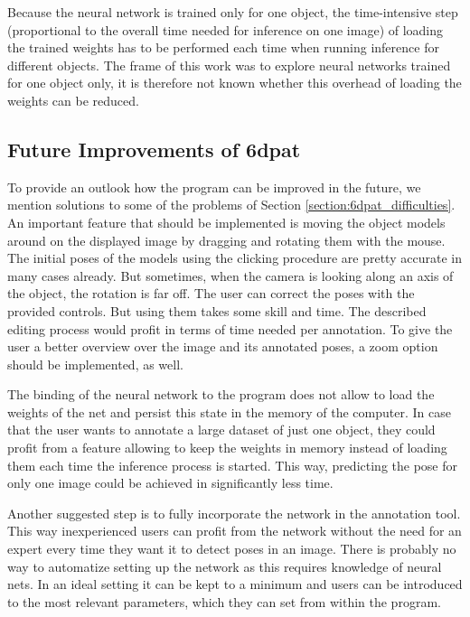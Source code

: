 Because the neural network is trained only for one object, the time-intensive step (proportional to the overall time needed for inference on one image) of loading the trained weights has to be performed each time when running inference for different objects. The frame of this work was to explore neural networks trained for one object only, it is therefore not known whether this overhead of loading the weights can be reduced.

\subsection{Future Improvements of \gls{6dpat}}

To provide an outlook how the program can be improved in the future, we mention solutions to some of the problems of Section \ref{section:6dpat_difficulties}. An important feature that should be implemented is moving the object models around on the displayed image by dragging and rotating them with the mouse. The initial poses of the models using the clicking procedure are pretty accurate in many cases already. But sometimes, when the camera is looking along an axis of the object, the rotation is far off. The user can correct the poses with the provided controls. But using them takes some skill and time. The described editing process would profit in terms of time needed per annotation. To give the user a better overview over the image and its annotated poses, a zoom option should be implemented, as well.

The binding of the neural network to the program does not allow to load the weights of the net and persist this state in the memory of the computer. In case that the user wants to annotate a large dataset of just one object, they could profit from a feature allowing to keep the weights in memory instead of loading them each time the inference process is started. This way, predicting the pose for only one image could be achieved in significantly less time.

Another suggested step is to fully incorporate the network in the annotation tool. This way inexperienced users can profit from the network without the need for an expert every time they want it to detect poses in an image. There is probably no way to automatize setting up the network as this requires knowledge of neural nets. In an ideal setting it can be kept to a minimum and users can be introduced to the most relevant parameters, which they can set from within the program.